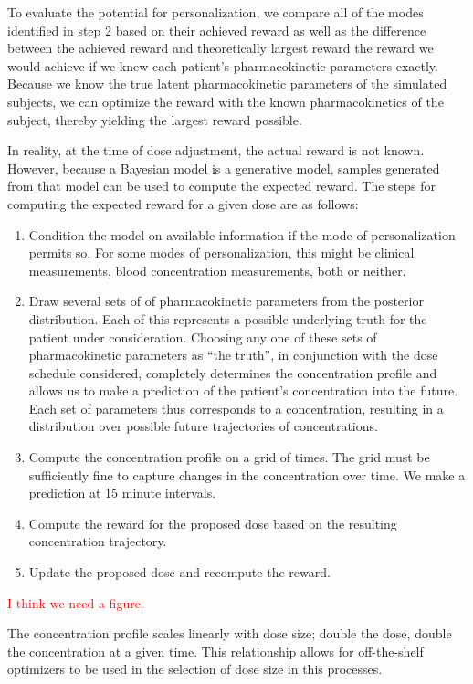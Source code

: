 To evaluate the potential for personalization, we compare all of the modes identified in step 2 based on their achieved reward as well as the difference between the achieved reward and theoretically largest reward the reward we would achieve if we knew each patient's pharmacokinetic parameters exactly. Because we know the true latent pharmacokinetic parameters of the simulated subjects, we can optimize the reward with the known pharmacokinetics of the subject, thereby yielding the largest reward possible.

In reality, at the time of dose adjustment, the actual reward is not known.  However, because a Bayesian model is a generative model, samples generated from that model can be used to compute the expected reward.  The steps for computing the expected reward for a given dose are as follows:

\begin{enumerate}
	\item Condition the model on available information if the mode of personalization permits so.  For some modes of personalization, this might be clinical measurements, blood concentration measurements, both or neither.
	
	\item Draw several sets of of pharmacokinetic parameters from the posterior distribution. Each of this represents a possible underlying truth for the patient  under consideration. Choosing any one of these sets of pharmacokinetic parameters as ``the truth'', in conjunction with the dose schedule considered, completely determines the concentration profile and allows us to make a prediction of the patient's concentration into the future. Each set of parameters thus corresponds to a concentration, resulting in a distribution over possible future trajectories of concentrations.
	
	\item Compute the concentration profile on a grid of times.  The grid must be sufficiently fine to capture changes in the concentration over time.  We make a prediction at 15 minute intervals.
	
	\item Compute the reward for the proposed dose based on the resulting concentration trajectory.
	
	\item Update the proposed dose and recompute the reward.
\end{enumerate}

\textcolor{red}{I think we need a figure.}

The concentration profile scales linearly with dose size; double the dose, double the concentration at a given time.  This relationship allows for off-the-shelf optimizers to be used in the selection of dose size in this processes.
